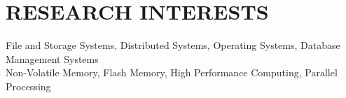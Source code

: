 \section{RESEARCH INTERESTS}
\vspace{0.07in}
File and Storage Systems, Distributed Systems, Operating Systems,
Database Management Systems\vspace{0.03in}\\
Non-Volatile Memory, Flash Memory, High Performance Computing,
Parallel Processing

